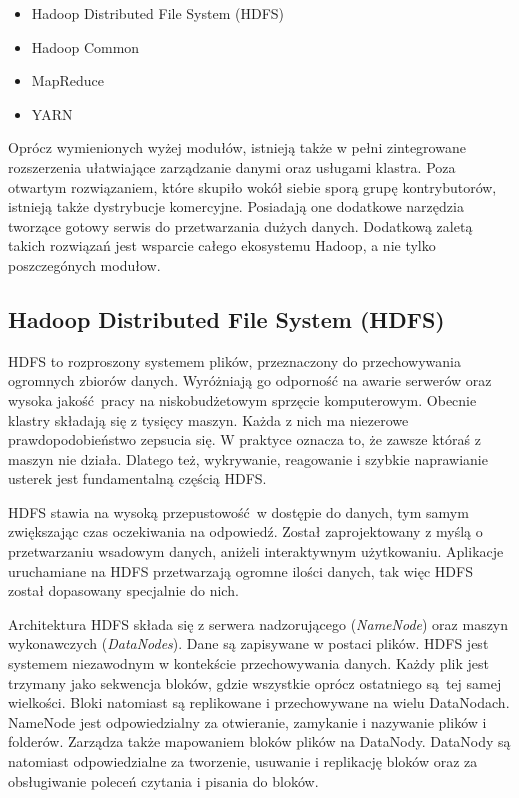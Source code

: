 \documentclass{pracamgr}
\begin{document}
\begin{itemize}
    \item Hadoop Distributed File System (HDFS)
    \item Hadoop Common
    \item MapReduce
    \item YARN
\end{itemize}

Oprócz wymienionych wyżej modułów, istnieją także w pełni zintegrowane rozszerzenia ułatwiające zarządzanie danymi oraz usługami klastra. Poza otwartym rozwiązaniem, które skupiło wokół siebie sporą grupę kontrybutorów, istnieją także dystrybucje komercyjne. Posiadają one dodatkowe narzędzia tworzące gotowy serwis do przetwarzania dużych danych. Dodatkową zaletą takich rozwiązań jest wsparcie całego ekosystemu Hadoop, a nie tylko poszczegónych modułow.

\subsection{Hadoop Distributed File System (HDFS)}

HDFS to rozproszony systemem plików, przeznaczony do przechowywania ogromnych zbiorów danych. Wyróżniają go odporność  na awarie serwerów oraz wysoka jakość pracy na niskobudżetowym sprzęcie komputerowym. Obecnie klastry składają się z tysięcy maszyn. Każda z nich ma niezerowe prawdopodobieństwo zepsucia się. W praktyce oznacza to, że zawsze któraś z maszyn nie działa. Dlatego też, wykrywanie, reagowanie i szybkie naprawianie usterek jest fundamentalną częścią HDFS.

HDFS stawia na wysoką przepustowość w dostępie do danych, tym samym zwiększając czas oczekiwania na odpowiedź. Został zaprojektowany z myślą o przetwarzaniu wsadowym danych, aniżeli interaktywnym użytkowaniu. Aplikacje uruchamiane na HDFS przetwarzają ogromne ilości danych, tak więc HDFS został dopasowany specjalnie do nich.

Architektura HDFS składa się z serwera nadzorującego (\textit{NameNode}) oraz maszyn wykonawczych (\textit{DataNodes}). Dane są zapisywane w postaci plików. HDFS jest systemem niezawodnym w kontekście przechowywania danych. Każdy plik jest trzymany jako sekwencja bloków, gdzie wszystkie oprócz ostatniego są tej samej wielkości. Bloki natomiast są replikowane i przechowywane na wielu DataNodach. NameNode jest odpowiedzialny za otwieranie, zamykanie i nazywanie plików i folderów. Zarządza także mapowaniem bloków plików na DataNody. DataNody są natomiast odpowiedzialne za tworzenie, usuwanie i replikację bloków oraz za obsługiwanie poleceń czytania i pisania do bloków.
\end{document}
